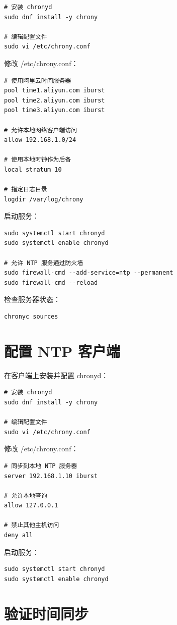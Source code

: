 \documentclass[12pt,UTF8]{ctexbook}
\begin{document}
\begin{verbatim}
# 安装 chronyd
sudo dnf install -y chrony

# 编辑配置文件
sudo vi /etc/chrony.conf
\end{verbatim}

修改 /etc/chrony.conf：
\begin{verbatim}
# 使用阿里云时间服务器
pool time1.aliyun.com iburst
pool time2.aliyun.com iburst
pool time3.aliyun.com iburst

# 允许本地网络客户端访问
allow 192.168.1.0/24

# 使用本地时钟作为后备
local stratum 10

# 指定日志目录
logdir /var/log/chrony
\end{verbatim}

启动服务：
\begin{verbatim}
sudo systemctl start chronyd
sudo systemctl enable chronyd

# 允许 NTP 服务通过防火墙
sudo firewall-cmd --add-service=ntp --permanent
sudo firewall-cmd --reload
\end{verbatim}

检查服务器状态：
\begin{verbatim}
chronyc sources
\end{verbatim}

\section{配置 NTP 客户端}
\label{sec:practice_client}

在客户端上安装并配置 chronyd：

\begin{verbatim}
# 安装 chronyd
sudo dnf install -y chrony

# 编辑配置文件
sudo vi /etc/chrony.conf
\end{verbatim}

修改 /etc/chrony.conf：
\begin{verbatim}
# 同步到本地 NTP 服务器
server 192.168.1.10 iburst

# 允许本地查询
allow 127.0.0.1

# 禁止其他主机访问
deny all
\end{verbatim}

启动服务：
\begin{verbatim}
sudo systemctl start chronyd
sudo systemctl enable chronyd
\end{verbatim}

\section{验证时间同步}
\label{sec:practice_verify}
\end{document}
